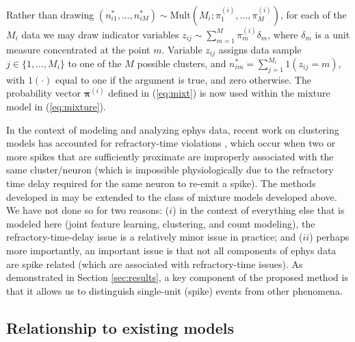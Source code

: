 \documentclass[journal]{IEEEtran}
\newcommand{\bv}{\boldsymbol{b}}
\newcommand{\lambdav}{\boldsymbol{\lambda}}
\newcommand{\piv}{\boldsymbol{\pi}}
\begin{document}
Rather than drawing $(n_{i1}^*,\dots,n_{iM}^*)\sim\mbox{Mult}(M_i;\pi_1^{(i)},\dots,\pi_M^{(i)})$, for each of the $M_i$ data we may draw indicator variables $z_{ij}\sim\sum_{m=1}^M\pi_m^{(i)}\delta_m$, where $\delta_m$ is a unit measure concentrated at the point $m$. Variable $z_{ij}$ assigns data sample $j\in\{1,\dots,M_i\}$ to one of the $M$ possible clusters, and $n_{im}^*=\sum_{j=1}^{M_i} 1(z_{ij}=m)$, with $1(\cdot)$ equal to one if the argument is true, and zero otherwise. The probability vector $\piv^{(i)}$ defined in (\ref{eq:mixt}) is now used within the mixture model in (\ref{eq:mixture}).


In the context of modeling and analyzing ephys data, recent work on clustering models has accounted for refractory-time
violations \cite{Wood2009,Bo2011}, which occur when two or more spikes that
are sufficiently proximate are improperly associated with the same
cluster/neuron (which is impossible physiologically due to the refractory time delay
required for the same neuron to re-emit a spike). The methods developed in \cite{Wood2009,Bo2011} may be extended to the class of mixture models developed above. We have not done so for two reasons: ($i$) in the context of everything else that is modeled here (joint feature learning, clustering, and count modeling), the refractory-time-delay issue is a relatively minor issue in practice; and ($ii$) perhaps more importantly, an important issue is that not all components of ephys data are spike related (which are associated with refractory-time issues). As demonstrated in Section \ref{sec:results}, a key component of the proposed method is that it allows us to distinguish single-unit (spike) events from other phenomena.

\subsection{Relationship to existing models\label{sec:related}}
\end{document}
